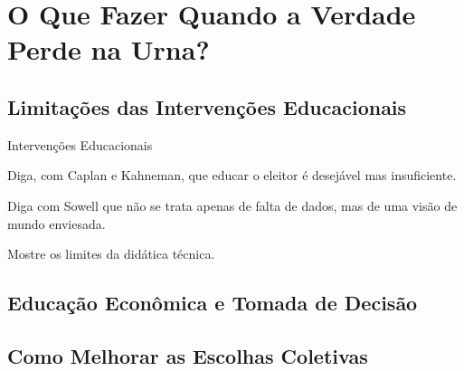 

\chapter{O Que Fazer Quando a Verdade Perde na Urna?} %


\section{Limitações das Intervenções Educacionais} %


Intervenções Educacionais

Diga, com Caplan e Kahneman, que educar o eleitor é desejável mas insuficiente.

Diga com Sowell que não se trata apenas de falta de dados, mas de uma visão de mundo enviesada.

Mostre os limites da didática técnica.



\section{Educação Econômica e Tomada de Decisão} %


\section{Como Melhorar as Escolhas Coletivas} %


